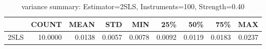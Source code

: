 \begin{table}[ht]
\centering
\caption{variance summary: Estimator=2SLS, Instruments=100, Strength=0.40}
\begin{tabular}{lrrrrrrrr}
\toprule
 & COUNT & MEAN & STD & MIN & 25\% & 50\% & 75\% & MAX \\
\midrule
2SLS & 10.0000 & 0.0138 & 0.0057 & 0.0078 & 0.0092 & 0.0119 & 0.0183 & 0.0237 \\
\bottomrule
\end{tabular}
\end{table}
